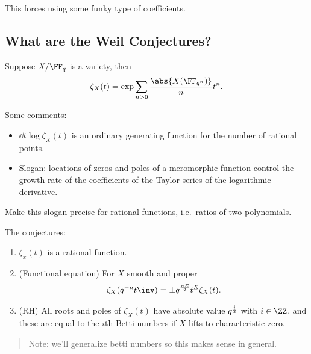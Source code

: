 This forces using some funky type of coefficients.

\hypertarget{what-are-the-weil-conjectures}{%
\subsection{What are the Weil
Conjectures?}\label{what-are-the-weil-conjectures}}

Suppose \(X/\FF_q\) is a variety, then
\begin{align*}  
\zeta_X(t) = \exp{\sum_{n>0} { {\abs{X(\FF_{q^n})} \over n} t^n } }
.\end{align*}

Some comments:

\begin{itemize}
\tightlist
\item
  \(\dd{}{t} \log \zeta_X(t)\) is an ordinary generating function for
  the number of rational points.
\item
  Slogan: locations of zeros and poles of a meromorphic function control
  the growth rate of the coefficients of the Taylor series of the
  logarithmic derivative.
\end{itemize}

\begin{exercise}

Make this slogan precise for rational functions, i.e.~ratios of two
polynomials.

\end{exercise}

The conjectures:

\begin{enumerate}
\def\labelenumi{\arabic{enumi}.}
\item
  \(\zeta_x(t)\) is a rational function.
\item
  (Functional equation) For \(X\) smooth and proper
  \begin{align*}  
  \zeta_X(q^{-n} t\inv) = \pm q^{nE \over 2} t^E \zeta_X(t)
  .\end{align*}
\item
  (RH) All roots and poles of \(\zeta_X(t)\) have absolute value
  \(q^{i\over 2}\) with \(i\in \ZZ\), and these are equal to the \(i\)th
  Betti numbers if \(X\) lifts to characteristic zero.
\end{enumerate}

\begin{quote}
Note: we'll generalize betti numbers so this makes sense in general.
\end{quote}

